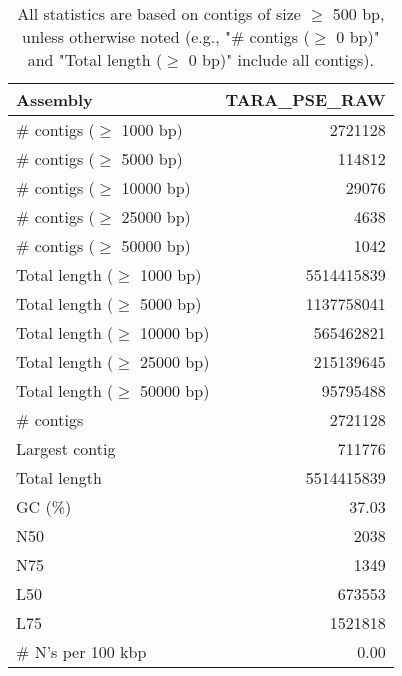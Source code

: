 \documentclass[12pt,a4paper]{article}
\begin{document}
\begin{table}[ht]
\begin{center}
\caption{All statistics are based on contigs of size $\geq$ 500 bp, unless otherwise noted (e.g., "\# contigs ($\geq$ 0 bp)" and "Total length ($\geq$ 0 bp)" include all contigs).}
\begin{tabular}{|l*{1}{|r}|}
\hline
Assembly & TARA\_PSE\_RAW \\ \hline
\# contigs ($\geq$ 1000 bp) & 2721128 \\ \hline
\# contigs ($\geq$ 5000 bp) & 114812 \\ \hline
\# contigs ($\geq$ 10000 bp) & 29076 \\ \hline
\# contigs ($\geq$ 25000 bp) & 4638 \\ \hline
\# contigs ($\geq$ 50000 bp) & 1042 \\ \hline
Total length ($\geq$ 1000 bp) & 5514415839 \\ \hline
Total length ($\geq$ 5000 bp) & 1137758041 \\ \hline
Total length ($\geq$ 10000 bp) & 565462821 \\ \hline
Total length ($\geq$ 25000 bp) & 215139645 \\ \hline
Total length ($\geq$ 50000 bp) & 95795488 \\ \hline
\# contigs & 2721128 \\ \hline
Largest contig & 711776 \\ \hline
Total length & 5514415839 \\ \hline
GC (\%) & 37.03 \\ \hline
N50 & 2038 \\ \hline
N75 & 1349 \\ \hline
L50 & 673553 \\ \hline
L75 & 1521818 \\ \hline
\# N's per 100 kbp & 0.00 \\ \hline
\end{tabular}
\end{center}
\end{table}
\end{document}
